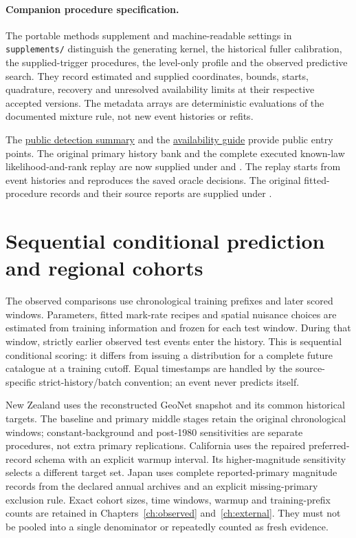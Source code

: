 \paragraph{Companion procedure specification.}
The portable methods supplement and machine-readable settings in \texttt{supplements/}
 distinguish the generating kernel, the historical fuller calibration, the supplied-trigger procedures, the level-only profile and the observed predictive search. They record estimated and supplied coordinates, bounds, starts, quadrature, recovery and unresolved availability limits at their respective accepted versions. The metadata arrays are deterministic evaluations of the documented mixture rule, not new event histories or refits.

The \href{https://github.com/Drefetr/An_Evaluation_of_Earthquake_Models/blob/61aa599cd023f2441a6a0c6af9aa4b6fe9eda3e5/paper/data/detection.json}{public detection summary} and the \hyperref[sec:source-supplements]{availability guide} provide public entry points. The original primary history bank and the complete executed known-law likelihood-and-rank replay are now supplied under  and . The replay starts from event histories and reproduces the saved oracle decisions. The original fitted-procedure records and their source reports are supplied under .


\section{Sequential conditional prediction and regional cohorts}\label{sec:unified-design}

The observed comparisons use chronological training prefixes and later scored windows. Parameters, fitted mark-rate recipes and spatial nuisance choices are estimated from training information and frozen for each test window. During that window, strictly earlier observed test events enter the history. This is sequential conditional scoring: it differs from issuing a distribution for a complete future catalogue at a training cutoff. Equal timestamps are handled by the source-specific strict-history/batch convention; an event never predicts itself.

New Zealand uses the reconstructed GeoNet snapshot and its common historical targets. The baseline and primary middle stages retain the original chronological windows; constant-background and post-1980 sensitivities are separate procedures, not extra primary replications. California uses the repaired preferred-record schema with an explicit warmup interval. Its higher-magnitude sensitivity selects a different target set. Japan uses complete reported-primary magnitude records from the declared annual archives and an explicit missing-primary exclusion rule. Exact cohort sizes, time windows, warmup and training-prefix counts are retained in Chapters~\ref{ch:observed} and~\ref{ch:external}. They must not be pooled into a single denominator or repeatedly counted as fresh evidence.

